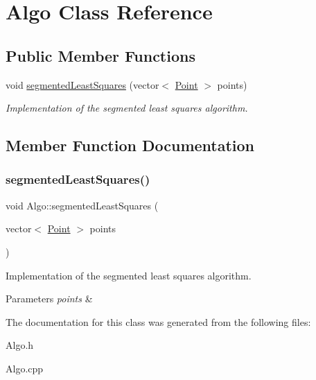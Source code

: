 \hypertarget{classAlgo}{}\section{Algo Class Reference}
\label{classAlgo}
\subsection*{Public Member Functions}
\begin{DoxyCompactItemize}
\item 
void \hyperlink{classAlgo_adee3b5676525988954fc307da272561d}{segmented\+Least\+Squares} (vector$<$ \hyperlink{classPoint}{Point} $>$ points)
\begin{DoxyCompactList}\small\item\em Implementation of the segmented least squares algorithm. \end{DoxyCompactList}\end{DoxyCompactItemize}


\subsection{Member Function Documentation}
\mbox{\label{classAlgo_adee3b5676525988954fc307da272561d}} 
\subsubsection{\texorpdfstring{segmented\+Least\+Squares()}{segmentedLeastSquares()}}
{\footnotesize\ttfamily void Algo\+::segmented\+Least\+Squares (\begin{DoxyParamCaption}\item[{vector$<$ \hyperlink{classPoint}{Point} $>$}]{points }\end{DoxyParamCaption})}



Implementation of the segmented least squares algorithm. 


\begin{DoxyParams}{Parameters}
{\em points} & \\
\hline
\end{DoxyParams}


The documentation for this class was generated from the following files\+:\begin{DoxyCompactItemize}
\item 
Algo.\+h\item 
Algo.\+cpp\end{DoxyCompactItemize}
